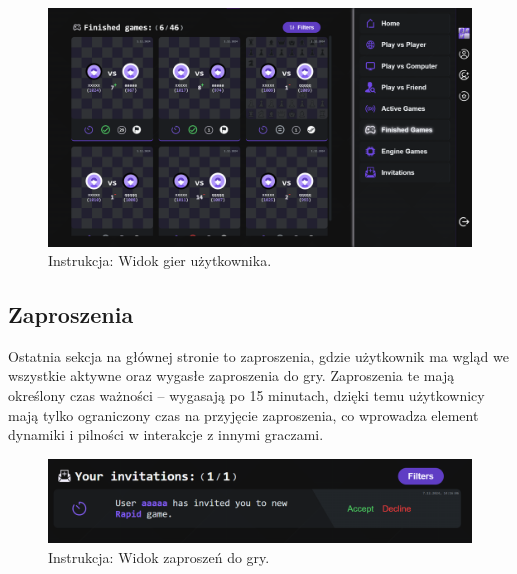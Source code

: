 \documentclass[twoside]{projektInzynierskiMS1}
\begin{document}
\vspace{0.5cm}
\begin{figure}[h!]
    \centering
    \includegraphics[width=1\textwidth]{images/ins_min_games.png}
    \caption{Instrukcja: Widok gier użytkownika.}
\end{figure}

\newpage

\subsection{Zaproszenia}

\noindent
Ostatnia sekcja na głównej stronie to zaproszenia, gdzie użytkownik ma wgląd we wszystkie aktywne oraz wygasłe zaproszenia do gry. Zaproszenia te mają określony czas ważności – wygasają po 15 minutach, dzięki temu użytkownicy mają tylko ograniczony czas na przyjęcie zaproszenia, co wprowadza element dynamiki i pilności w interakcje z innymi graczami.

\vspace{0.5cm}
\begin{figure}[h!]
    \centering
    \includegraphics[width=1\textwidth]{images/ins_min_inv_card.png}
    \caption{Instrukcja: Widok zaproszeń do gry.}
\end{figure}
\vspace{0.5cm}
\end{document}
